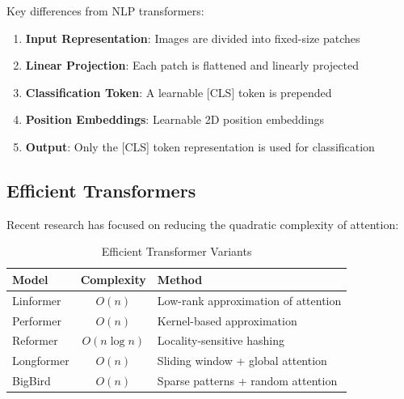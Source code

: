 Key differences from NLP transformers:
\begin{enumerate}
    \item \textbf{Input Representation}: Images are divided into fixed-size patches
    \item \textbf{Linear Projection}: Each patch is flattened and linearly projected
    \item \textbf{Classification Token}: A learnable [CLS] token is prepended
    \item \textbf{Position Embeddings}: Learnable 2D position embeddings
    \item \textbf{Output}: Only the [CLS] token representation is used for classification
\end{enumerate}

\subsection{Efficient Transformers}

Recent research has focused on reducing the quadratic complexity of attention:

\begin{table}[H]
\centering
\caption{Efficient Transformer Variants}
\begin{tabular}{l c l}
\toprule
\textbf{Model} & \textbf{Complexity} & \textbf{Method} \\
\midrule
Linformer & $O(n)$ & Low-rank approximation of attention \\
Performer & $O(n)$ & Kernel-based approximation \\
Reformer & $O(n \log n)$ & Locality-sensitive hashing \\
Longformer & $O(n)$ & Sliding window + global attention \\
BigBird & $O(n)$ & Sparse patterns + random attention \\
\bottomrule
\end{tabular}
\end{table}
